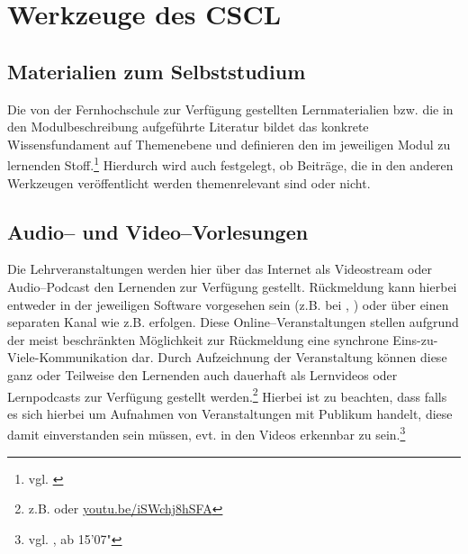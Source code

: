 
\newpage
\section{Werkzeuge des CSCL} %
\label{sec:werkzeuge_des_cscl}

\subsection{Materialien zum Selbststudium} %
\label{sub:materialien_zum_selbststudium}
Die von der Fernhochschule zur Verfügung gestellten Lernmaterialien bzw. die in den Modulbeschreibung aufgeführte Literatur bildet das konkrete Wissensfundament auf Themenebene und definieren den im jeweiligen Modul zu lernenden Stoff.\footnote{vgl. \cite{pnikmail}} Hierdurch wird auch festgelegt, ob Beiträge, die in den anderen Werkzeugen veröffentlicht werden themenrelevant sind oder nicht.

\subsection{Audio– und Video–Vorlesungen} %
\label{sub:audio_und_video_vorlesungen}
Die Lehrveranstaltungen werden hier über das Internet als Videostream oder Audio–Podcast den Lernenden zur Verfügung gestellt. Rückmeldung kann hierbei entweder in der jeweiligen Software vorgesehen sein (z.B. bei , ) oder über einen separaten Kanal wie z.B.  erfolgen. Diese Online–Veranstaltungen stellen aufgrund der meist beschränkten Möglichkeit zur Rückmeldung eine synchrone Eins-zu-Viele-Kommunikation dar. Durch Aufzeichnung der Veranstaltung können diese ganz oder Teilweise den Lernenden auch dauerhaft als Lernvideos oder Lernpodcasts zur Verfügung gestellt werden.\footnote{z.B.  oder \url{youtu.be/iSWchj8hSFA}} Hierbei ist zu beachten, dass falls es sich hierbei um Aufnahmen von Veranstaltungen mit Publikum handelt, diese damit einverstanden sein müssen, evt. in den Videos erkennbar zu sein.\footnote{vgl. \cite{cs50}, ab 15'07" }


